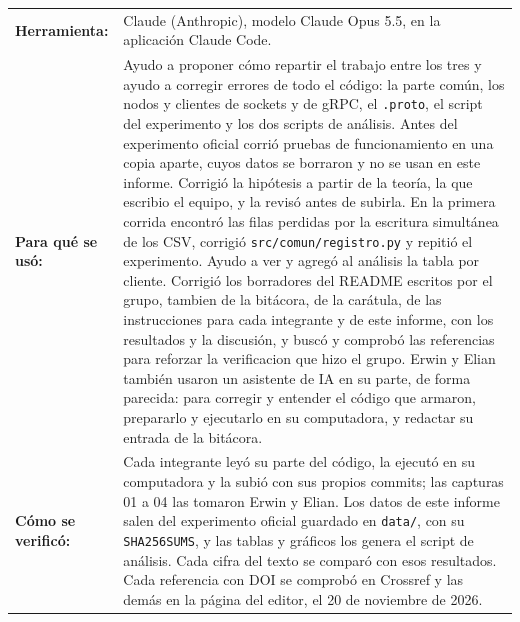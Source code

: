 \documentclass[11pt,a4paper]{article}
\begin{document}
\noindent
\begin{tabularx}{\textwidth}{>{\bfseries}l >{\raggedright\arraybackslash}X}
  Herramienta: & Claude (Anthropic), modelo Claude Opus 5.5, en la aplicación Claude Code. \\[3pt]
  Para qué se usó: & Ayudo a proponer cómo repartir el trabajo entre los tres y ayudo a corregir errores de todo el código: la parte común, los nodos y clientes de sockets y de gRPC, el \texttt{.proto}, el script del experimento y los dos scripts de análisis. Antes del experimento oficial corrió pruebas de funcionamiento en una copia aparte, cuyos datos se borraron y no se usan en este informe. Corrigió la hipótesis a partir de la teoría, la que escribio el equipo, y la revisó antes de subirla. En la primera corrida encontró las filas perdidas por la escritura simultánea de los CSV, corrigió \texttt{src/comun/registro.py} y repitió el experimento. Ayudo a ver y agregó al análisis la tabla por cliente. Corrigió los borradores del README escritos por el grupo, tambien de la bitácora, de la carátula, de las instrucciones para cada integrante y de este informe, con los resultados y la discusión, y buscó y comprobó las referencias para reforzar la verificacion que hizo el grupo. Erwin y Elian también usaron un asistente de IA en su parte, de forma parecida: para corregir y entender el código que armaron, prepararlo y ejecutarlo en su computadora, y redactar su entrada de la bitácora. \\[3pt]
  Cómo se verificó: & Cada integrante leyó su parte del código, la ejecutó en su computadora y la subió con sus propios commits; las capturas 01 a 04 las tomaron Erwin y Elian. Los datos de este informe salen del experimento oficial guardado en \texttt{data/}, con su \texttt{SHA256SUMS}, y las tablas y gráficos los genera el script de análisis. Cada cifra del texto se comparó con esos resultados. Cada referencia con DOI se comprobó en Crossref y las demás en la página del editor, el 20 de noviembre de 2026. \\
\end{tabularx}

\printbibliography[title={Referencias}]
\end{document}
